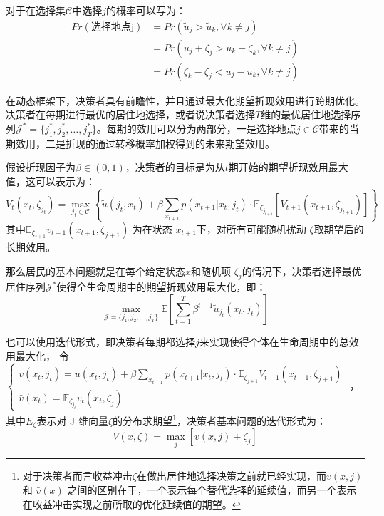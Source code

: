 \documentclass[a4paper,12pt,oneside]{book} %
\begin{document}
对于在选择集$\mathcal{C}$中选择$j$的概率可以写为：
\begin{equation}
\begin{split}
  Pr(\text{选择地点j})&=Pr(\tilde u_j > \tilde u_k, \forall k \neq j)
  \\&=Pr(u_j+\zeta_j>u_k+\zeta_k, \forall k \neq j)
  \\&=Pr(\zeta_k-\zeta_j<u_j-u_k, \forall k \neq j)
\end{split}
\label{eq:C中地点选择j的概率}
\end{equation}

在动态框架下，决策者具有前瞻性，并且通过最大化期望折现效用进行跨期优化。决策者在每期进行最优的居住地选择，或者说决策者选择$T$维的最优居住地选择序列$\mathcal{J}^*=\{j_1^*,j_2^*,\ldots,j_T^*\}$。每期的效用可以分为两部分，一是选择地点$j \in \mathcal{C}$带来的当期效用，二是折现的通过转移概率加权得到的未来期望效用。

假设折现因子为$\beta \in (0,1)$，决策者的目标是为从$t$期开始的期望折现效用最大值，这可以表示为：
\begin{equation}
  V_t(x_t, \zeta_{j_t}) = \max_{j_t \in \mathcal{C}} 
  \left\{ 
  \tilde{u}(j_t, x_t) + \beta \sum_{x_{t+1}} p(x_{t+1} | x_t, j_t) \cdot \mathbb{E}_{\zeta_{j_{t+1}}} [ V_{t+1}(x_{t+1}, \zeta_{j_{t+1}}) ]
  \right\}
\end{equation}
其中$\mathbb{E}_{\zeta_{j+1}} v_{t+1}(x_{t+1},\zeta_{j+1})$
为在状态 
$x_{t+1}$下，对所有可能随机扰动 
$\zeta$取期望后的长期效用。

那么居民的基本问题就是在每个给定状态$x$和随机项 $\zeta_j$的情况下，决策者选择最优居住序列$\mathcal{J}^*$使得全生命周期中的期望折现效用最大化，即：
\begin{equation}
  \max_{\mathcal{J}=\{j_1,j_2,\ldots,j_T\}} \mathbb{E} [ \sum_{t=1}^{T} \beta^{t-1} \tilde{u}_{j_t}(x_t, j_t) ]
\end{equation}

也可以使用迭代形式，即决策者每期都选择$j$来实现使得个体在生命周期中的总效用最大化，
令
$\begin{cases}
  v(x_{t},j_{t})=u(x_{t} , j_{t} )+\beta \sum_{x_{t+1}} p(x_{t+1}|x_t,j_t) \cdot \mathbb{E}_{\zeta_{j+1}} V_{t+1}(x_{t+1},\zeta_{j+1})
  \\
  \bar v(x_{t})=\mathbb{E}_{\zeta_{j_t}} v_{t}(x_{t},\zeta_{j})
\end{cases}$
，其中$E_{\zeta}$表示对 J 维向量$\zeta$的分布求期望\footnote{对于决策者而言收益冲击$\zeta$在做出居住地选择决策之前就已经实现，而$v(x,j)$ 和 $\bar v(x)$ 之间的区别在于，一个表示每个替代选择的延续值，而另一个表示在收益冲击实现之前所取的优化延续值的期望。}，决策者基本问题的迭代形式为：
\begin{equation}
V(x,\zeta)=\max\limits_{j}[v(x,j)+\zeta_{j}]
\end{equation}
\end{document}
